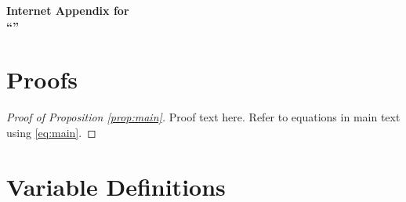 


\setcounter{page}{1}
\setcounter{equation}{0}
\setcounter{figure}{0}
\setcounter{table}{0}
\setcounter{section}{0}
\renewcommand{\theequation}{IA.\arabic{equation}}
\renewcommand{\thefigure}{IA.\Roman{figure}}
\renewcommand{\thetable}{IA.\Roman{table}}
\renewcommand{\thesection}{IA.\arabic{section}}
\renewcommand{\thesubsection}{\thesection.\arabic{subsection}}



\begin{center}
{\Large \bf Internet Appendix for \\ ``\Title''}
\end{center}

\bigskip



\section{Proofs} \label{ia:proof}

\noindent
\begin{proof}[Proof of Proposition \ref{prop:main}]
    Proof text here. Refer to equations in main text using \eqref{eq:main}.
\end{proof}


\section{Variable Definitions} \label{ia:variables}

